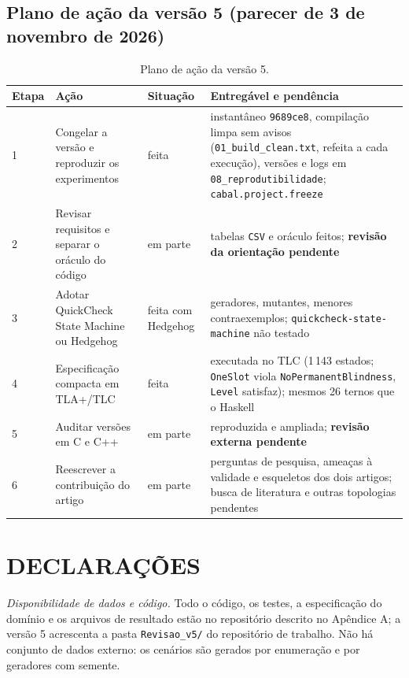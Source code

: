 \documentclass[12pt,a4paper]{article}
\begin{document}
\subsection*{Plano de ação da versão 5 (parecer de 3 de novembro de 2026)}

\begin{table}[h]
\centering
\footnotesize
\begin{tabular}{|p{1.0cm}|p{4.2cm}|p{2.2cm}|p{6.5cm}|}
\hline
Etapa & Ação & Situação & Entregável e pendência \\
\hline
1 & Congelar a versão e reproduzir os experimentos & feita & instantâneo \texttt{9689ce8}, compilação limpa sem avisos (\texttt{01\_build\_clean.txt}, refeita a cada execução), versões e logs em \texttt{08\_reprodutibilidade}; \texttt{cabal.project.freeze} \\
\hline
2 & Revisar requisitos e separar o oráculo do código & em parte & tabelas \texttt{CSV} e oráculo feitos; \textbf{revisão da orientação pendente} \\
\hline
3 & Adotar QuickCheck State Machine ou Hedgehog & feita com Hedgehog & geradores, mutantes, menores contraexemplos; \texttt{quickcheck-state-machine} não testado \\
\hline
4 & Especificação compacta em TLA+/TLC & feita & executada no TLC (1\,143 estados; \texttt{OneSlot} viola \texttt{NoPermanentBlindness}, \texttt{Level} satisfaz); mesmos 26 ternos que o Haskell \\
\hline
5 & Auditar versões em C e C++ & em parte & reproduzida e ampliada; \textbf{revisão externa pendente} \\
\hline
6 & Reescrever a contribuição do artigo & em parte & perguntas de pesquisa, ameaças à validade e esqueletos dos dois artigos; busca de literatura e outras topologias pendentes \\
\hline
\end{tabular}
\caption{Plano de ação da versão 5.}
\end{table}



\section*{DECLARAÇÕES}

\textit{Disponibilidade de dados e código.} Todo o código, os testes, a especificação do domínio e os arquivos de resultado estão no repositório descrito no Apêndice A; a versão 5 acrescenta a pasta \texttt{Revisao\_v5/} do repositório de trabalho. Não há conjunto de dados externo: os cenários são gerados por enumeração e por geradores com semente.
\end{document}
